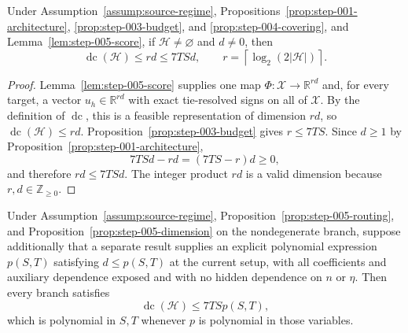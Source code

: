 \begin{proposition}
\label{prop:step-005-dimension}
Under Assumption~\ref{assump:source-regime},
Propositions~\ref{prop:step-001-architecture},
\ref{prop:step-003-budget}, and \ref{prop:step-004-covering}, and
Lemma~\ref{lem:step-005-score}, if $\mathcal H\neq\varnothing$ and
$d\neq0$, then
\[
\operatorname{dc}(\mathcal H)\leq rd\leq7TSd,
\qquad
r=\left\lceil\log_2(2|\mathcal H|)\right\rceil.
\]
\end{proposition}

\begin{proof}
Lemma~\ref{lem:step-005-score} supplies one map
$\Phi:\mathcal X\to\mathbb R^{rd}$ and, for every target, a vector
$u_h\in\mathbb R^{rd}$ with exact tie-resolved signs on all of $\mathcal X$.
By the definition of $\operatorname{dc}$, this is a feasible representation
of dimension $rd$, so $\operatorname{dc}(\mathcal H)\leq rd$.
Proposition~\ref{prop:step-003-budget} gives $r\leq7TS$.  Since $d\geq1$
by Proposition~\ref{prop:step-001-architecture},
\[
7TSd-rd=(7TS-r)d\geq0,
\]
and therefore $rd\leq7TSd$.  The integer product $rd$ is a valid dimension
because $r,d\in\mathbb Z_{\geq0}$.
\end{proof}

\begin{corollary}
\label{cor:step-005-polynomial-bridge}
Under Assumption~\ref{assump:source-regime},
Proposition~\ref{prop:step-005-routing}, and
Proposition~\ref{prop:step-005-dimension} on the nondegenerate branch, suppose
additionally that a separate result supplies an explicit polynomial expression
$p(S,T)$ satisfying $d\leq p(S,T)$ at the current setup, with all coefficients
and auxiliary dependence exposed and with no hidden dependence on $n$ or
$\eta$.  Then every branch satisfies
\[
\operatorname{dc}(\mathcal H)\leq7TSp(S,T),
\]
which is polynomial in $S,T$ whenever $p$ is polynomial in those variables.
\end{corollary}

